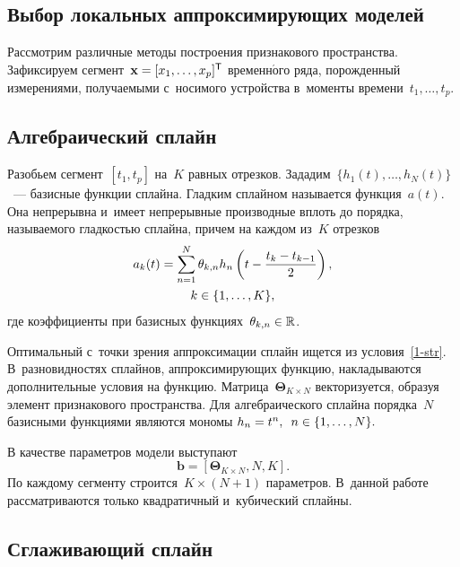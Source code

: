 \begin{multicols}{2}
\section{Выбор локальных аппроксимирующих моделей}

Рассмотрим различные методы построения признакового 
пространства. Зафиксируем сегмент~$\mathbf{x}\hm=[x_1,\ldots,x_p]^\mathsf{T}$ 
временн$\acute{\mbox{о}}$го ряда, порожденный измерениями, получаемыми с~носимого 
устройства в~моменты времени~$t_1,\ldots,t_p$.

\subsection{Алгебраический сплайн}

Разобьем сегмент~$[t_1,t_p]$ на~$K$ равных отрезков. Зададим~$\{h_1(t),\ldots,
h_N(t)\}$~--- базисные функции сплайна. Гладким сплайном называется 
функция~$a(t)$. Она непрерывна и~имеет непрерывные производные вплоть 
до порядка, называемого гладкостью сплайна, причем на каждом из~$K$ отрезков
\begin{multline}
\label{2-str}
a_k(t)=\sum\limits_{n=1}^N \theta_{k,n} 
 h_n\left(t-\displaystyle\frac{\displaystyle t_k-t_{k-1}\mathstrut}{\displaystyle 2\mathstrut}\right), \\
 k\in\{1,\ldots,K\},
\end{multline}
где коэффициенты при базисных функциях~$\theta_{k,n}\hm\in \mathbb{R}$.

Оптимальный с~точки зрения аппроксимации сплайн ищется из условия~\eqref{1-str}.
В~разновидностях сплайнов, аппроксимирующих функцию, накладываются 
дополнительные условия на функцию. Матрица~$\boldsymbol{\Theta}_{K \times N}$ 
векторизуется, образуя элемент признакового пространства.
Для алгебраического сплайна порядка~$N$ базисными функциями являются мономы
$
h_n=t^n, \enskip   n \in \{1,\dots,N\}.
$

В качестве параметров модели выступают
\begin{equation}
\label{4-str}
\mathbf{b} = \left[\boldsymbol{\Theta}_{K \times N},N,K\right].
\end{equation}
По каждому сегменту строится~$K\times (N+1)$ параметров. 
В~данной работе рассматриваются только квадратичный и~кубический сплайны.

\subsection{Сглаживающий сплайн}


\end{multicols}
